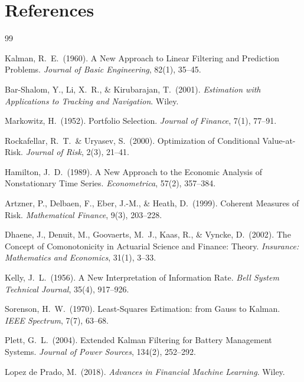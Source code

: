 \documentclass[12pt,openany]{book}
\numberwithin{equation}{chapter}
\theoremstyle{plain}
\theoremstyle{definition}
\theoremstyle{remark}
\begin{document}
\chapter*{References}

\begin{thebibliography}{99}

Kalman, R.\ E.\ (1960).
A New Approach to Linear Filtering and Prediction Problems.
\textit{Journal of Basic Engineering}, 82(1), 35--45.

Bar-Shalom, Y., Li, X.\ R., \& Kirubarajan, T.\ (2001).
\textit{Estimation with Applications to Tracking and Navigation}.
Wiley.

Markowitz, H.\ (1952).
Portfolio Selection.
\textit{Journal of Finance}, 7(1), 77--91.

Rockafellar, R.\ T.\ \& Uryasev, S.\ (2000).
Optimization of Conditional Value-at-Risk.
\textit{Journal of Risk}, 2(3), 21--41.

Hamilton, J.\ D.\ (1989).
A New Approach to the Economic Analysis of Nonstationary Time Series.
\textit{Econometrica}, 57(2), 357--384.

Artzner, P., Delbaen, F., Eber, J.-M., \& Heath, D.\ (1999).
Coherent Measures of Risk.
\textit{Mathematical Finance}, 9(3), 203--228.

Dhaene, J., Denuit, M., Goovaerts, M.\ J., Kaas, R., \& Vyncke, D.\
(2002).
The Concept of Comonotonicity in Actuarial Science and Finance: Theory.
\textit{Insurance: Mathematics and Economics}, 31(1), 3--33.

Kelly, J.\ L.\ (1956).
A New Interpretation of Information Rate.
\textit{Bell System Technical Journal}, 35(4), 917--926.

Sorenson, H.\ W.\ (1970).
Least-Squares Estimation: from Gauss to Kalman.
\textit{IEEE Spectrum}, 7(7), 63--68.

Plett, G.\ L.\ (2004).
Extended Kalman Filtering for Battery Management Systems.
\textit{Journal of Power Sources}, 134(2), 252--292.

Lopez de Prado, M.\ (2018).
\textit{Advances in Financial Machine Learning}.
Wiley.

\end{thebibliography}
\end{document}
